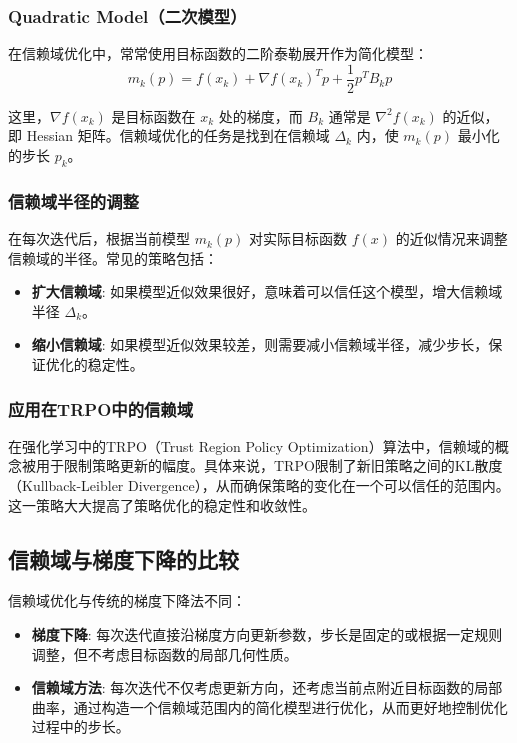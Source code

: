 \documentclass[twocolumn, 10pt]{article} %
\theoremstyle{remark}
\begin{document}
\subsubsection{Quadratic Model（二次模型）}

在信赖域优化中，常常使用目标函数的二阶泰勒展开作为简化模型：
\[
m_k(p) = f(x_k) + \nabla f(x_k)^T p + \frac{1}{2} p^T B_k p
\]

这里，\( \nabla f(x_k) \) 是目标函数在 \( x_k \) 处的梯度，而 \( B_k \) 通常是 \( \nabla^2 f(x_k) \) 的近似，即 Hessian 矩阵。信赖域优化的任务是找到在信赖域 \( \Delta_k \) 内，使 \( m_k(p) \) 最小化的步长 \( p_k \)。

\subsubsection{信赖域半径的调整}

在每次迭代后，根据当前模型 \( m_k(p) \) 对实际目标函数 \( f(x) \) 的近似情况来调整信赖域的半径。常见的策略包括：
\begin{itemize}
    \item \textbf{扩大信赖域}: 如果模型近似效果很好，意味着可以信任这个模型，增大信赖域半径 \( \Delta_k \)。
    \item \textbf{缩小信赖域}: 如果模型近似效果较差，则需要减小信赖域半径，减少步长，保证优化的稳定性。
\end{itemize}

\subsubsection{应用在TRPO中的信赖域}

在强化学习中的TRPO（Trust Region Policy Optimization）算法中，信赖域的概念被用于限制策略更新的幅度。具体来说，TRPO限制了新旧策略之间的KL散度（Kullback-Leibler Divergence），从而确保策略的变化在一个可以信任的范围内。这一策略大大提高了策略优化的稳定性和收敛性。

\subsection{信赖域与梯度下降的比较}

信赖域优化与传统的梯度下降法不同：
\begin{itemize}
    \item \textbf{梯度下降}: 每次迭代直接沿梯度方向更新参数，步长是固定的或根据一定规则调整，但不考虑目标函数的局部几何性质。
    \item \textbf{信赖域方法}: 每次迭代不仅考虑更新方向，还考虑当前点附近目标函数的局部曲率，通过构造一个信赖域范围内的简化模型进行优化，从而更好地控制优化过程中的步长。
\end{itemize}
\end{document}
